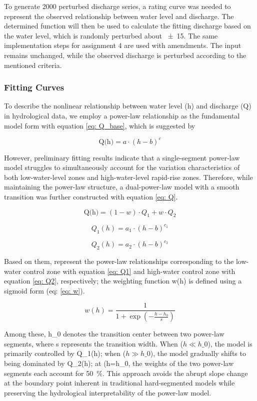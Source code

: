 To generate 2000 perturbed discharge series, a rating curve was needed to represent the observed relationship between water level and discharge. The determined function will then be used to calculate the fitting discharge based on the water level, which is randomly perturbed about \SI{\pm15}{}. The same implementation steps for assignment 4 are used with amendments. The input remains unchanged, while the observed discharge is perturbed according to the mentioned criteria. 

\subsubsection{Fitting Curves}
To describe the nonlinear relationship between water level (h) and discharge (Q) in hydrological data, we employ a power-law relationship as the fundamental model form with equation \ref{eq: Q_base}, which is suggested by \cite{LECOZ2014573}

\begin{equation}
     \text{Q(h)} = a\cdot(h-b)^c
     \label{eq: Q_base}
\end{equation}


However, preliminary fitting results indicate that a single-segment power-law model struggles to simultaneously account for the variation characteristics of both low-water-level zones and high-water-level rapid-rise zones. Therefore, while maintaining the power-law structure, a dual-power-law model with a smooth transition was further constructed with equation \ref{eq: Q}.

\begin{equation}
     \text{Q(h)} = (1 - w)\cdot Q_1 + w \cdot Q_2
     \label{eq: Q}
\end{equation}

\begin{equation}
     Q_1(h) = a_1\cdot(h-b)^{c_1}
     \label{eq: Q1}
\end{equation}

\begin{equation}
     Q_2(h) = a_2\cdot(h-b)^{c_2}
     \label{eq: Q2}
\end{equation}

Based on them, represent the power-law relationships corresponding to the low-water control zone with equation \ref{eq: Q1} and high-water control zone with equation \ref{eq: Q2}, respectively; the weighting function w(h) is defined using a sigmoid form (eq: \ref{eq: w}).

\begin{equation}
     w(h)=\frac{1}{1+\exp\left(-\frac{h-h_0}{s}\right)}
     \label{eq: w}
\end{equation}

Among these, h\_0 denotes the transition center between two power-law segments, where s represents the transition width. When ($h\mathclose{\ll}h\_0$), the model is primarily controlled by Q\_1(h); when ($h\mathclose{\gg}h\_0$), the model gradually shifts to being dominated by Q\_2(h); at (h=h\_0, the weights of the two power-law segments each account for \SI{50}{\percent}. This approach avoids the abrupt slope change at the boundary point inherent in traditional hard-segmented models while preserving the hydrological interpretability of the power-law model. 
